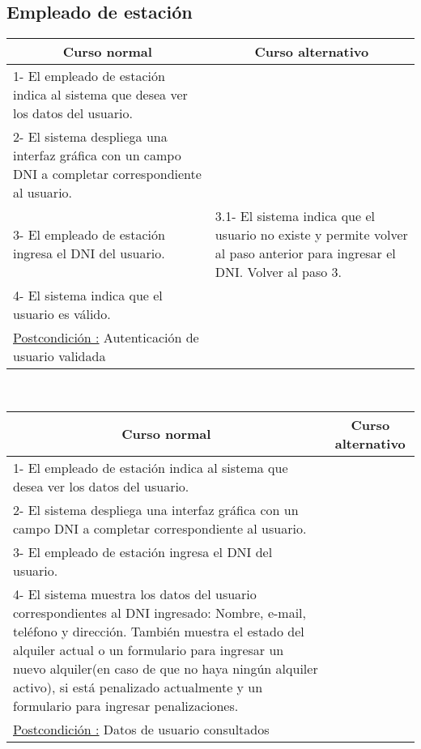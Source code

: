 \subsection{Empleado de estación}

\begin{center}
    \centering
    \begin{tabular}{ | p{11cm} | p{6cm} | }
    	\multicolumn{1}{c}{\cellcolor{black!30}\textbf{Curso normal}} & 
    	\multicolumn{1}{c}{\cellcolor{black!30}\textbf{Curso alternativo}} \\
		\hline
		1- El empleado de estación indica al sistema que desea ver los datos del usuario. &  \\ \hline
		2- El sistema despliega una interfaz gráfica con un campo DNI a completar correspondiente al usuario. &  \\ \hline
		3- El empleado de estación ingresa el DNI del usuario. &  
		3.1- El sistema indica que el usuario no existe y permite volver al paso anterior para ingresar el DNI. Volver al paso 3. \\ \hline
		4- El sistema indica que el usuario es válido. & \\ \hline
		\underline{Postcondición :} Autenticación de usuario validada & \\ \hline
    \end{tabular}
\end{center}

~

\begin{center}
    \centering
    \begin{tabular}{ | p{11cm} | p{6cm} | }
    	\multicolumn{1}{c}{\cellcolor{black!30}\textbf{Curso normal}} & 
    	\multicolumn{1}{c}{\cellcolor{black!30}\textbf{Curso alternativo}} \\
		\hline
		1- El empleado de estación indica al sistema que desea ver los datos del usuario. &  \\ \hline
		2- El sistema despliega una interfaz gráfica con un campo DNI a completar correspondiente al usuario. &  \\ \hline
		3- El empleado de estación ingresa el DNI del usuario. & \\ \hline  
		4- El sistema muestra los datos del usuario correspondientes al DNI ingresado: Nombre, e-mail, teléfono y dirección. También muestra el estado del alquiler actual o un formulario para ingresar un nuevo alquiler(en caso de que no haya ningún alquiler activo), si está penalizado actualmente y un formulario para ingresar penalizaciones. & \\ \hline		
		\underline{Postcondición :} Datos de usuario consultados & \\ \hline
    \end{tabular}
\end{center}

